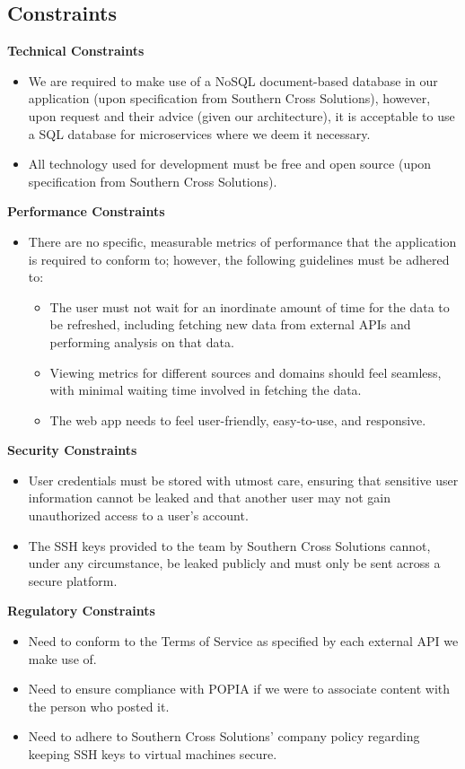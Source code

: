 \documentclass[12pt]{article}
\begin{document}
\subsection*{Constraints}

\textbf{Technical Constraints}
\begin{itemize}
  \item We are required to make use of a NoSQL document-based database in our application (upon specification from Southern Cross Solutions), however, upon request and their advice (given our architecture), it is acceptable to use a SQL database for microservices where we deem it necessary.
  \item All technology used for development must be free and open source (upon specification from Southern Cross Solutions).
\end{itemize}

\textbf{Performance Constraints}
\begin{itemize}
  \item There are no specific, measurable metrics of performance that the application is required to conform to; however, the following guidelines must be adhered to:
    \begin{itemize}
      \item The user must not wait for an inordinate amount of time for the data to be refreshed, including fetching new data from external APIs and performing analysis on that data.
      \item Viewing metrics for different sources and domains should feel seamless, with minimal waiting time involved in fetching the data.
      \item The web app needs to feel user-friendly, easy-to-use, and responsive.
    \end{itemize}
\end{itemize}

\textbf{Security Constraints}
\begin{itemize}
  \item User credentials must be stored with utmost care, ensuring that sensitive user information cannot be leaked and that another user may not gain unauthorized access to a user's account.
  \item The SSH keys provided to the team by Southern Cross Solutions cannot, under any circumstance, be leaked publicly and must only be sent across a secure platform.
\end{itemize}

\textbf{Regulatory Constraints}
\begin{itemize}
  \item Need to conform to the Terms of Service as specified by each external API we make use of.
  \item Need to ensure compliance with POPIA if we were to associate content with the person who posted it.
  \item Need to adhere to Southern Cross Solutions' company policy regarding keeping SSH keys to virtual machines secure.
\end{itemize}
\end{document}
